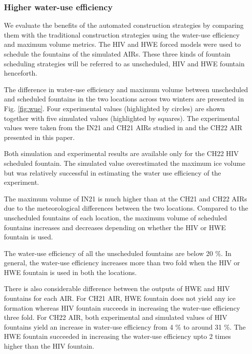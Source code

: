 \documentclass[tc, manuscript]{copernicus}
\begin{document}
\subsubsection{Higher water-use efficiency}

We evaluate the benefits of the automated construction strategies by comparing them with the traditional
construction strategies using the water-use efficiency and maximum volume metrics. The HIV and HWE forced models
were used to schedule the fountains of the simulated AIRs. These three kinds of fountain scheduling
strategies will be referred to as unscheduled, HIV and HWE fountain henceforth. 

The difference in water-use efficiency and maximum volume between unscheduled and scheduled fountains in the two
locations across two winters are presented in Fig. \ref{fig:wue}. Four experimental values (highlighted by
circles) are shown together with five simulated values (highlighted by squares).  The experimental values were
taken from the IN21 and CH21 AIRs studied in \citet{balasubramanianInfluenceMeteorologicalConditions2022} and
the CH22 AIR presented in this paper. 

Both simulation and experimental results are available only for the CH22 HIV scheduled fountain. The simulated
value overestimated the maximum ice volume but was relatively successful in estimating the water use efficiency
of the experiment.

The maximum volume of IN21 is much higher than at the CH21 and CH22 AIRs due to the meteorological differences
between the two locations. Compared to the unscheduled fountains of each location, the maximum volume of 
scheduled fountains increases and decreases depending on whether the HIV or HWE fountain is used. 

The water-use efficiency of all the unscheduled fountains are below 20 \%. In general, the water-use efficiency
increases more than two fold when the HIV or HWE fountain is used in both the locations.  

There is also considerable difference between the outputs of HWE and HIV fountains for each AIR. For CH21 AIR,
HWE fountain does not yield any ice formation whereas HIV fountain succeeds in increasing the water-use
efficiency three fold. For CH22 AIR, both experimental and simulated values of HIV fountains yield an increase
in water-use efficiency from 4 \% to around 31 \%. The HWE fountain succeeded in increasing the water-use
efficiency upto 2 times higher than the HIV fountain.
\end{document}
